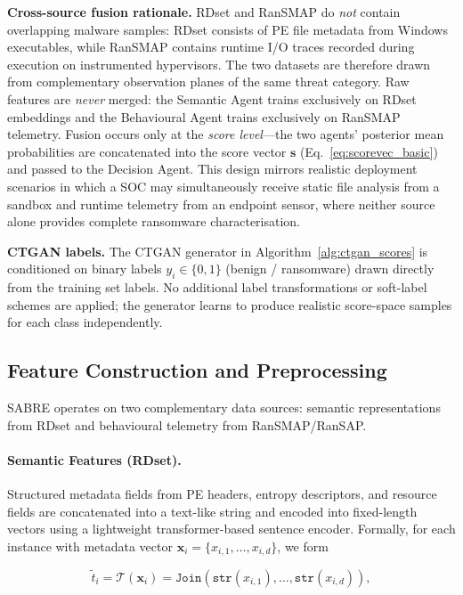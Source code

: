 \documentclass[lettersize,journal]{IEEEtran}
\begin{document}
\noindent\textbf{Cross-source fusion rationale.}
RDset and RanSMAP do \emph{not} contain overlapping malware samples: RDset consists of PE
file metadata from Windows executables, while RanSMAP contains runtime I/O traces recorded
during execution on instrumented hypervisors. The two datasets are therefore drawn from
complementary observation planes of the same threat category. Raw features are
\emph{never} merged: the Semantic Agent trains exclusively on RDset embeddings and the
Behavioural Agent trains exclusively on RanSMAP telemetry. Fusion occurs only at the
\emph{score level}---the two agents' posterior mean probabilities are concatenated into the
score vector $\mathbf{s}$ (Eq.~\ref{eq:scorevec_basic}) and passed to the Decision Agent.
This design mirrors realistic deployment scenarios in which a SOC may simultaneously receive
static file analysis from a sandbox and runtime telemetry from an endpoint sensor, where
neither source alone provides complete ransomware characterisation.

\noindent\textbf{CTGAN labels.}
The CTGAN generator in Algorithm~\ref{alg:ctgan_scores} is conditioned on binary labels
$y_i \in \{0,1\}$ (benign / ransomware) drawn directly from the training set labels. No
additional label transformations or soft-label schemes are applied; the generator learns to
produce realistic score-space samples for each class independently.


\subsection{Feature Construction and Preprocessing}

SABRE operates on two complementary data sources: semantic representations from RDset and behavioural telemetry from RanSMAP/RanSAP.

\paragraph{Semantic Features (RDset).}
Structured metadata fields from PE headers, entropy
descriptors, and resource fields are concatenated into a text-like string and encoded into fixed-length vectors using a lightweight transformer-based
sentence encoder. Formally, for each instance with metadata vector
$\mathbf{x}_i = \{x_{i,1}, \ldots, x_{i,d}\}$, we form

\begin{equation}
\tilde{t}_i = \mathcal{T}(\mathbf{x}_i) = \texttt{Join}(\texttt{str}(x_{i,1}), \ldots, \texttt{str}(x_{i,d})),
\end{equation}
\end{document}
